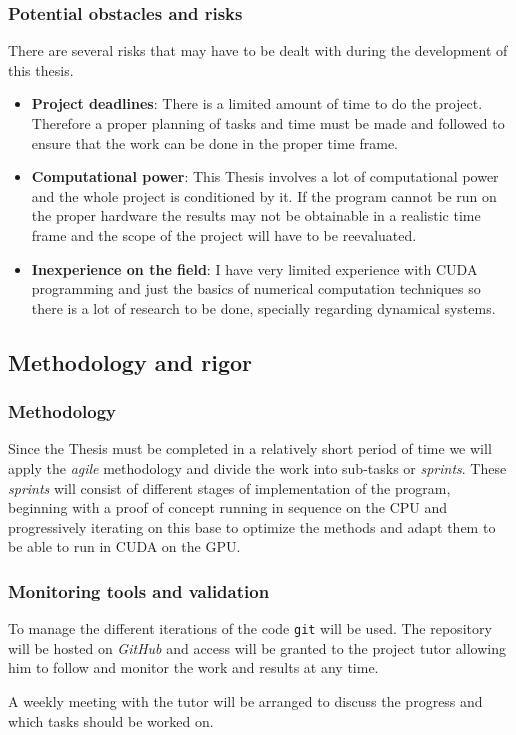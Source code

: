 \subsubsection{Potential obstacles and risks}

There are several risks that may have to be dealt with during the development of this thesis.

\begin{itemize}
    \item \textbf{Project deadlines}: There is a limited amount of time to do
        the project. Therefore a proper planning of tasks and time must be made
        and followed to ensure that the work can be done in the proper time
        frame.
    \item \textbf{Computational power}: This Thesis involves a lot of
        computational power and the whole project is conditioned by it. If the
        program cannot be run on the proper hardware the results may not be
        obtainable in a realistic time frame and the scope of the project will
        have to be reevaluated.
    \item \textbf{Inexperience on the field}: I have very limited experience
        with CUDA programming and just the basics of numerical computation
        techniques so there is a lot of research to be done, specially regarding
        dynamical systems.
\end{itemize}

\subsection{Methodology and rigor}

\subsubsection{Methodology}

Since the Thesis must be completed in a relatively short period of time we will
apply the \emph{agile} methodology and divide the work into sub-tasks or
\emph{sprints}. These \emph{sprints} will consist of different stages of
implementation of the program, beginning with a proof of concept running in
sequence on the CPU and progressively iterating on this base to optimize the
methods and adapt them to be able to run in CUDA on the GPU.

\subsubsection{Monitoring tools and validation}

To manage the different iterations of the code \texttt{git} will be used. The
repository will be hosted on \emph{GitHub} and access will be granted to the
project tutor allowing him to follow and monitor the work and results at any
time.

A weekly meeting with the tutor will be arranged to discuss the progress and
which tasks should be worked on.
